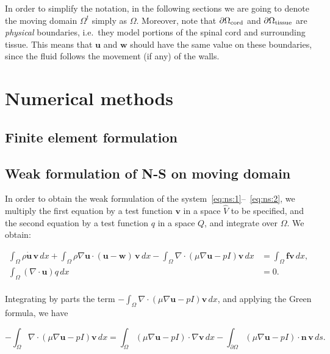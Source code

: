 \documentclass[11pt,a4paper,titlepage]{report}
\begin{document}
In order to simplify the notation, in the following sections we are going to denote the moving domain $\Omega^t$ simply as $\Omega$. Moreover, note that $\partial \Omega_{\rm cord}$ and $\partial \Omega_{\rm
  tissue}$ are \textit{physical} boundaries, i.e.~they model portions
of the spinal cord and surrounding tissue. This means that
$\mathbf{u}$ and $\mathbf{w}$ should have the same value on these
boundaries, since the fluid follows the movement (if any) of the
walls.



\chapter{Numerical methods}

\section{Finite element formulation}

\section{Weak formulation of N-S on moving domain}
In order to obtain the weak formulation of the system~\eqref{eq:ns:1}--~\eqref{eq:ns:2}, we multiply the first equation by a test function $\mathbf{v}$ in a space $\hat{V}$ to be specified, and the second equation by a test function $q$ in a space $Q$, and integrate over $\Omega$. 
We obtain:

\begin{align}
\label{eq:ns:9}
\int_{\Omega} \rho \dot{\mathbf{u}} \, \mathbf{v} \, dx
+ \int_{\Omega} \rho \nabla \mathbf{u} \cdot (\mathbf{u} - \mathbf{w}) \, \mathbf{v} \, dx
- \int_{\Omega} \nabla \cdot (\mu \nabla \mathbf{u} - pI)\mathbf{v} \, dx
&= \int_{\Omega} \mathbf{f} \mathbf{v} \, dx, \\
\int_{\Omega}  (\nabla \cdot \mathbf{u}) q \, dx &= 0.
\end{align}
\\
Integrating by parts the term $- \int_{\Omega} \nabla \cdot (\mu \nabla \mathbf{u} - pI)\mathbf{v} \, dx$, and applying the Green formula, we have

\begin{equation}
\label{eq:green}
- \int_{\Omega} \nabla \cdot (\mu \nabla \mathbf{u} - pI)\mathbf{v} \, dx =  \int_{\Omega} (\mu \nabla \mathbf{u} - pI) \cdot \nabla \mathbf{v} \, dx - \int_{\partial \Omega} (\mu \nabla \mathbf{u} - pI) \cdot \mathbf{n} \, \mathbf{v} \, ds.
\end{equation}
\end{document}
